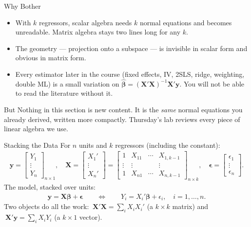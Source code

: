 \documentclass[aspectratio=169,11pt,xcolor=dvipsnames]{beamer}
\newcommand{\X}{\bm{X}}
\newcommand{\Y}{\bm{y}}
\newcommand{\bhat}{\hat{\bm{\beta}}}
\begin{document}
\begin{frame}{Why Bother}
\begin{itemize}\itemsep5pt
  \item With $k$ regressors, scalar algebra needs $k$ normal equations and becomes
        unreadable. Matrix algebra stays two lines long for any $k$.
  \item The \alert{geometry} --- projection onto a subspace --- is invisible in
        scalar form and obvious in matrix form.
  \item Every estimator later in the course (fixed effects, IV, 2SLS, ridge,
        weighting, double ML) is a small variation on
        $\bhat = (\X'\X)^{-1}\X'\Y$. You will not be able to read the literature
        without it.
\end{itemize}
\vskip6pt
\begin{alertblock}{But}
Nothing in this section is new content. It is the \emph{same} normal equations
you already derived, written more compactly. Thursday's lab reviews every piece
of linear algebra we use.
\end{alertblock}
\end{frame}

\begin{frame}{Stacking the Data}
For $n$ units and $k$ regressors (including the constant):
\begin{align*}
  \Y = \begin{bmatrix} Y_1 \\ \vdots \\ Y_n \end{bmatrix}_{n\times 1},
  \quad
  \X = \begin{bmatrix} X_1' \\ \vdots \\ X_n' \end{bmatrix}
     = \begin{bmatrix}
        1 & X_{11} & \cdots & X_{1,k-1}\\
        \vdots & \vdots & & \vdots \\
        1 & X_{n1} & \cdots & X_{n,k-1}
       \end{bmatrix}_{n\times k},
  \quad
  \bm\epsilon = \begin{bmatrix} \epsilon_1 \\ \vdots \\ \epsilon_n\end{bmatrix}.
\end{align*}
The model, stacked over units:
\begin{align*}
  \Y = \X\bm\beta + \bm\epsilon
  \qquad\Longleftrightarrow\qquad
  Y_i = X_i'\bm\beta + \epsilon_i,\quad i=1,\dots,n .
\end{align*}
Two objects do all the work:
$\ \X'\X = \sum_i X_iX_i'$ (a $k\times k$ matrix) and
$\ \X'\Y = \sum_i X_i Y_i$ (a $k\times 1$ vector).
\end{frame}
\end{document}
